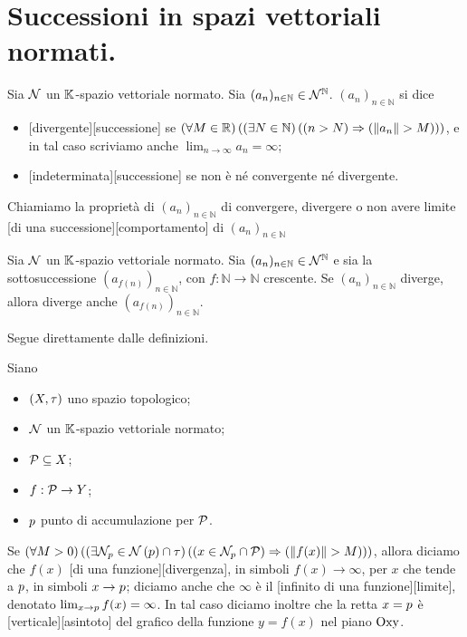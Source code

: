 \section{Successioni in spazi vettoriali normati.}
\label{TeoriaDelleSuccessioniEDelleSerie_SuccessioniInSpaziVettorialiNormati}
\begin{Definition}
	Sia $\mathcal{N}$ un $\mathbb{K}$-spazio vettoriale normato.
	Sia $(a_n)_{n \in \mathbb{N}} \in \mathcal{N}^\mathbb{N}$. $(a_n)_{n \in \mathbb{N}}$ si dice
	\begin{itemize}
		\item {}[divergente][successione] se $\ForAll{M \in \mathbb{R}}{\Exists{N \in \mathbb{N}}{\Implies{n > N}{\Norm{a_n} > M}}}$, e in tal caso scriviamo anche $\lim_{n \rightarrow \infty} a_n = \infty$;
		\item {}[indeterminata][successione] se non \`e n\'e convergente n\'e divergente.
	\end{itemize}
	Chiamiamo la propriet\`a di $(a_n)_{n \in \mathbb{N}}$ di convergere, divergere o non avere limite [di una successione][comportamento] di $(a_n)_{n \in \mathbb{N}}$
\end{Definition}
\begin{Definition}
	Sia $\mathcal{N}$ un $\mathbb{K}$-spazio vettoriale normato.
	Sia $(a_n)_{n \in \mathbb{N}} \in \mathcal{N}^\mathbb{N}$ e sia la sottosuccessione $(a_{f(n)})_{n \in \mathbb{N}}$, con $f: \mathbb{N} \rightarrow \mathbb{N}$ crescente. Se $(a_n)_{n \in \mathbb{N}}$ diverge, allora diverge anche $(a_{f(n)})_{n \in \mathbb{N}}$.
\end{Definition}
\Proof Segue direttamente dalle definizioni. \EndProof
\begin{Definition}
	Siano
	\begin{itemize}
		\item $(X,\tau)$ uno spazio topologico;
		\item $\mathcal{N}$ un $\mathbb{K}$-spazio vettoriale normato;
		\item $\mathcal{P} \subseteq X$;
		\item $f: \mathcal{P} \rightarrow Y$;
		\item $p$ punto di accumulazione per $\mathcal{P}$.
	\end{itemize}
	Se $\ForAll{M > 0}{\Exists{\Neighborhood_\AccumulationPoint \in \Neighborhoods{\AccumulationPoint} \cap \Topology}{\Implies{x \in \Neighborhood_\AccumulationPoint \cap \Part}{\Norm{f(x)} > M}}}$, allora diciamo che $f(x)$ [di una funzione][divergenza], in simboli $f(x) \rightarrow \infty$, per $x$ che tende a $p$, in simboli $x \rightarrow p$; diciamo anche che $\infty$ \`e il [infinito di una funzione][limite], denotato $\lim_{x \rightarrow p} f(x) = \infty$. In tal caso diciamo inoltre che la retta $x = p$ \`e [verticale][asintoto] del grafico della funzione $y = f(x)$ nel piano $\text{Oxy}$.
\end{Definition}
